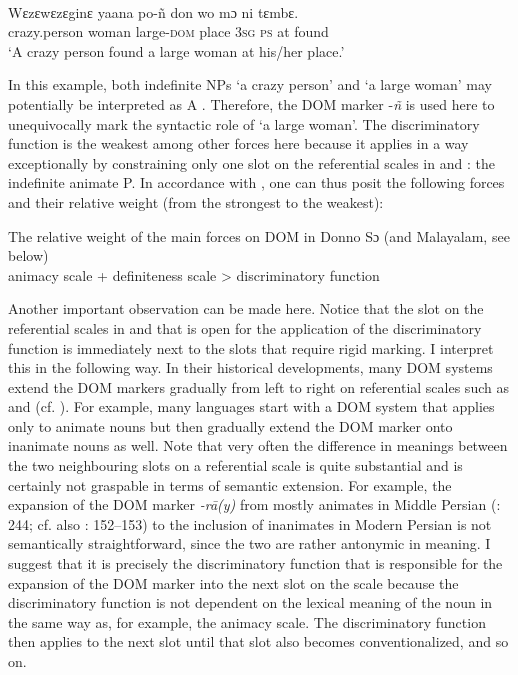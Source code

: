 \documentclass[output=paper]{langsci/langscibook}
\begin{document}
\ea\label{ex:serzant:8}
\\
\gll Wɛzɛwɛzɛginɛ   yaana     po-ñ     don   wo mɔ ni tɛmbɛ.\\
     crazy.person  woman    large\textsc{{}-dom}   place  \textsc{3sg} \textsc{ps}  at found\\
\glt ‘A crazy person found a large woman at his/her place.’
\z

In this example, both indefinite NPs ‘a crazy person’ and ‘a large woman’ may potentially be interpreted as A \citep[53]{Culy1995}. Therefore, the DOM marker -\textit{ñ} is used here to unequivocally mark the syntactic role of ‘a large woman’. The discriminatory function is the weakest among other forces here \citep[53]{Culy1995} because it applies in a way exceptionally by constraining only one slot on the referential scales in  and : the indefinite animate P. In accordance with \citet[51]{Culy1995}, one can thus posit the following forces and their relative weight (from the strongest to the weakest): 

\ea\label{ex:serzant:9}
The relative weight of the main forces on DOM in Donno Sɔ (and Malayalam, see below)\\
animacy scale + definiteness scale > discriminatory function\\
\z

Another important observation can be made here. Notice that the slot on the referential scales in  and  that is open for the application of the discriminatory function is immediately next to the slots that require rigid marking. I interpret this in the following way. In their historical developments, many DOM systems extend the DOM markers gradually from left to right on referential scales such as  and  (cf. \citealt{DalrympleNikolaeva2011}). For example, many languages start with a DOM system that applies only to animate nouns but then gradually extend the DOM marker onto inanimate nouns as well. Note that very often the difference in meanings between the two neighbouring slots on a referential scale is quite substantial and is certainly not graspable in terms of semantic extension. For example, the expansion of the DOM marker \textit{{}-rā(y)} from mostly animates in Middle Persian (\citealt{Key2008}: 244; cf. also \citealt{Paul2008}: 152–153) to the inclusion of inanimates in Modern Persian is not semantically straightforward, since the two are rather antonymic in meaning. I suggest that it is precisely the discriminatory function that is responsible for the expansion of the DOM marker into the next slot on the scale because the discriminatory function is not dependent on the lexical meaning of the noun in the same way as, for example, the animacy scale. The discriminatory function then applies to the next slot until that slot also becomes conventionalized, and so on. 
\end{document}

